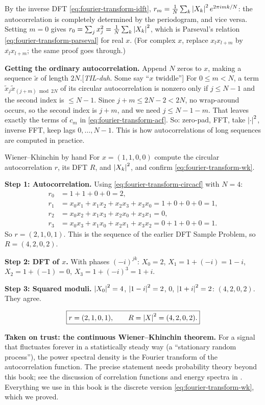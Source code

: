 By the inverse DFT \eqref{eq:fourier-transform-idft}, $r_m=\frac1N\sum_k\left\lvert X_k\right\rvert^2e^{2\pi imk/N}$: the autocorrelation is completely determined by the periodogram, and vice versa. Setting $m=0$ gives $r_0=\sum_jx_j^2=\frac1N\sum_k\left\lvert X_k\right\rvert^2$, which is Parseval's relation \eqref{eq:fourier-transform-parseval} for real $x$. (For complex $x$, replace $x_lx_{l+m}$ by $\overline{x_l}x_{l+m}$; the same proof goes through.)

\textbf{Getting the ordinary autocorrelation.} Append $N$ zeros to $x$, making a sequence $\tilde x$ of length $2N$.[\emph{TIL-duh}. Some say ``$x$ twiddle''] For $0\le m<N$, a term $\tilde x_j\tilde x_{(j+m)\bmod 2N}$ of its circular autocorrelation is nonzero only if $j\le N-1$ and the second index is $\le N-1$. Since $j+m\le2N-2<2N$, no wrap-around occurs, so the second index is $j+m$, and we need $j\le N-1-m$. That leaves exactly the terms of $c_m$ in \eqref{eq:fourier-transform-acf}. So: zero-pad, FFT, take $\left\lvert \cdot\right\rvert^2$, inverse FFT, keep lags $0,\dots,N-1$. This is how autocorrelations of long sequences are computed in practice.

\begin{sample}{Wiener--Khinchin by hand}
For $x=(1,1,0,0)$ compute the circular autocorrelation $r$, its DFT $R$, and $\left\lvert X_k\right\rvert^2$, and confirm \eqref{eq:fourier-transform-wk}.

\textbf{Step 1: Autocorrelation.} Using \eqref{eq:fourier-transform-circacf} with $N=4$:
\begin{align*}
r_0&=1+1+0+0=2,\\
r_1&=x_0x_1+x_1x_2+x_2x_3+x_3x_0=1+0+0+0=1,\\
r_2&=x_0x_2+x_1x_3+x_2x_0+x_3x_1=0,\\
r_3&=x_0x_3+x_1x_0+x_2x_1+x_3x_2=0+1+0+0=1.
\end{align*}
So $r=(2,1,0,1)$. This is the sequence of the earlier DFT Sample Problem, so $R=(4,2,0,2)$.

\textbf{Step 2: DFT of $x$.} With phases $(-i)^{jk}$: $X_0=2$, $X_1=1+(-i)=1-i$, $X_2=1+(-1)=0$, $X_3=1+(-i)^3=1+i$.

\textbf{Step 3: Squared moduli.} $\left\lvert X_0\right\rvert^2=4$, $\left\lvert 1-i\right\rvert^2=2$, $0$, $\left\lvert 1+i\right\rvert^2=2$: $(4,2,0,2)$. They agree.

\[\boxed{r=(2,1,0,1),\qquad R=\left\lvert X\right\rvert^2=(4,2,0,2).}\]
\end{sample}

\begin{beyond}
\textbf{Taken on trust: the continuous Wiener--Khinchin theorem.} For a signal that fluctuates forever in a statistically steady way (a ``stationary random process''), the power spectral density is the Fourier transform of the autocorrelation function. The precise statement needs probability theory beyond this book; see the discussion of correlation functions and energy spectra in \cite{rhb}. Everything we use in this book is the discrete version \eqref{eq:fourier-transform-wk}, which we proved.
\end{beyond}

